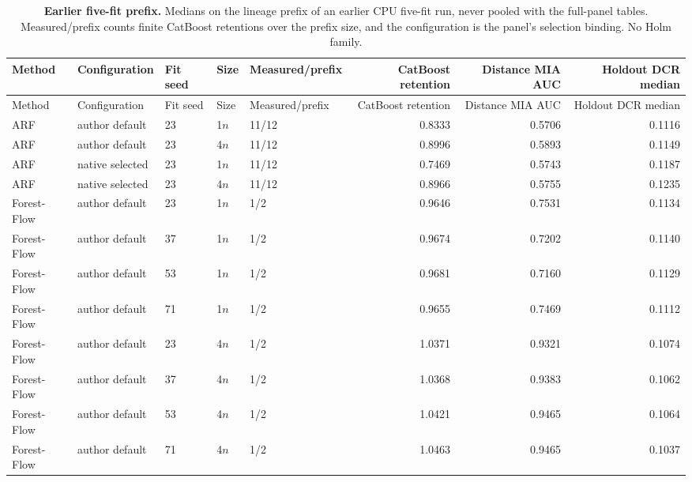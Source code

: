 \begin{longtable}{lllllrrr}
\caption{\textbf{Earlier five-fit prefix.} Medians on the lineage prefix of an earlier CPU five-fit run, never pooled with the full-panel tables. Measured/prefix counts finite CatBoost retentions over the prefix size, and the configuration is the panel's selection binding. No Holm family.}\label{tab:review-prefix}\\
\toprule
Method & Configuration & Fit seed & Size & Measured/prefix & CatBoost retention & Distance MIA AUC & Holdout DCR median \\
\midrule
\endfirsthead
\toprule
Method & Configuration & Fit seed & Size & Measured/prefix & CatBoost retention & Distance MIA AUC & Holdout DCR median \\
\midrule
\endhead
ARF & author default & 23 & 1$n$ & 11/12 & 0.8333 & 0.5706 & 0.1116 \\
ARF & author default & 23 & 4$n$ & 11/12 & 0.8996 & 0.5893 & 0.1149 \\
ARF & native selected & 23 & 1$n$ & 11/12 & 0.7469 & 0.5743 & 0.1187 \\
ARF & native selected & 23 & 4$n$ & 11/12 & 0.8966 & 0.5755 & 0.1235 \\
Forest-Flow & author default & 23 & 1$n$ & 1/2 & 0.9646 & 0.7531 & 0.1134 \\
Forest-Flow & author default & 37 & 1$n$ & 1/2 & 0.9674 & 0.7202 & 0.1140 \\
Forest-Flow & author default & 53 & 1$n$ & 1/2 & 0.9681 & 0.7160 & 0.1129 \\
Forest-Flow & author default & 71 & 1$n$ & 1/2 & 0.9655 & 0.7469 & 0.1112 \\
Forest-Flow & author default & 23 & 4$n$ & 1/2 & 1.0371 & 0.9321 & 0.1074 \\
Forest-Flow & author default & 37 & 4$n$ & 1/2 & 1.0368 & 0.9383 & 0.1062 \\
Forest-Flow & author default & 53 & 4$n$ & 1/2 & 1.0421 & 0.9465 & 0.1064 \\
Forest-Flow & author default & 71 & 4$n$ & 1/2 & 1.0463 & 0.9465 & 0.1037 \\
\bottomrule
\end{longtable}

